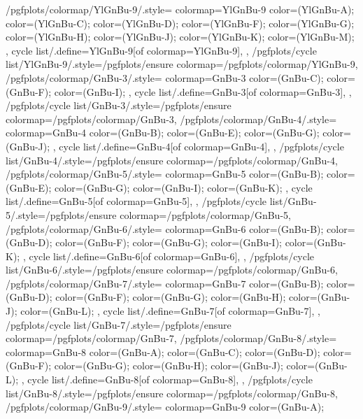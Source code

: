 {  %
  /pgfplots/colormap/YlGnBu-9/.style={
    colormap={YlGnBu-9}{
      color=(YlGnBu-A);
      color=(YlGnBu-C);
      color=(YlGnBu-D);
      color=(YlGnBu-F);
      color=(YlGnBu-G);
      color=(YlGnBu-H);
      color=(YlGnBu-J);
      color=(YlGnBu-K);
      color=(YlGnBu-M);
    },
    cycle list/.define={YlGnBu-9}{[of colormap=YlGnBu-9]},
  },
  /pgfplots/cycle list/YlGnBu-9/.style={/pgfplots/ensure colormap={/pgfplots/colormap/YlGnBu-9}},
  /pgfplots/colormap/GnBu-3/.style={
    colormap={GnBu-3}{
      color=(GnBu-C);
      color=(GnBu-F);
      color=(GnBu-I);
    },
    cycle list/.define={GnBu-3}{[of colormap=GnBu-3]},
  },
  /pgfplots/cycle list/GnBu-3/.style={/pgfplots/ensure colormap={/pgfplots/colormap/GnBu-3}},
  /pgfplots/colormap/GnBu-4/.style={
    colormap={GnBu-4}{
      color=(GnBu-B);
      color=(GnBu-E);
      color=(GnBu-G);
      color=(GnBu-J);
    },
    cycle list/.define={GnBu-4}{[of colormap=GnBu-4]},
  },
  /pgfplots/cycle list/GnBu-4/.style={/pgfplots/ensure colormap={/pgfplots/colormap/GnBu-4}},
  /pgfplots/colormap/GnBu-5/.style={
    colormap={GnBu-5}{
      color=(GnBu-B);
      color=(GnBu-E);
      color=(GnBu-G);
      color=(GnBu-I);
      color=(GnBu-K);
    },
    cycle list/.define={GnBu-5}{[of colormap=GnBu-5]},
  },
  /pgfplots/cycle list/GnBu-5/.style={/pgfplots/ensure colormap={/pgfplots/colormap/GnBu-5}},
  /pgfplots/colormap/GnBu-6/.style={
    colormap={GnBu-6}{
      color=(GnBu-B);
      color=(GnBu-D);
      color=(GnBu-F);
      color=(GnBu-G);
      color=(GnBu-I);
      color=(GnBu-K);
    },
    cycle list/.define={GnBu-6}{[of colormap=GnBu-6]},
  },
  /pgfplots/cycle list/GnBu-6/.style={/pgfplots/ensure colormap={/pgfplots/colormap/GnBu-6}},
  /pgfplots/colormap/GnBu-7/.style={
    colormap={GnBu-7}{
      color=(GnBu-B);
      color=(GnBu-D);
      color=(GnBu-F);
      color=(GnBu-G);
      color=(GnBu-H);
      color=(GnBu-J);
      color=(GnBu-L);
    },
    cycle list/.define={GnBu-7}{[of colormap=GnBu-7]},
  },
  /pgfplots/cycle list/GnBu-7/.style={/pgfplots/ensure colormap={/pgfplots/colormap/GnBu-7}},
  /pgfplots/colormap/GnBu-8/.style={
    colormap={GnBu-8}{
      color=(GnBu-A);
      color=(GnBu-C);
      color=(GnBu-D);
      color=(GnBu-F);
      color=(GnBu-G);
      color=(GnBu-H);
      color=(GnBu-J);
      color=(GnBu-L);
    },
    cycle list/.define={GnBu-8}{[of colormap=GnBu-8]},
  },
  /pgfplots/cycle list/GnBu-8/.style={/pgfplots/ensure colormap={/pgfplots/colormap/GnBu-8}},
  /pgfplots/colormap/GnBu-9/.style={
    colormap={GnBu-9}{
      color=(GnBu-A);
}}}
